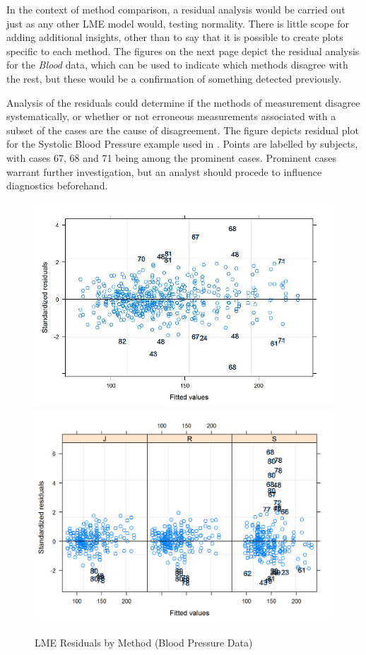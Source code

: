 \documentclass[12pt, a4paper]{report}
\theoremstyle{plain}
\theoremstyle{definition}
\theoremstyle{remark}
\begin{document}
In the context of method comparison, a residual analysis would be carried out just as any other LME model would, testing normality. There is little scope for adding additional insights, other than to say that it is possible to create plots specific to each method. The figures on the next page depict the residual analysis for the \textit{Blood} data, which can be used to indicate which methods disagree with the rest, but these would be a confirmation of something detected previously.

Analysis of the residuals could determine if the methods of measurement disagree systematically, or whether or not erroneous measurements associated with a subset of the cases are the cause of disagreement. 
The figure depicts residual plot for the Systolic Blood Pressure example used in \citet{BA99}. Points are labelled by subjects, with cases 67, 68 and 71 being among the prominent cases. Prominent cases warrant further investigation, but an analyst should procede to influence diagnostics beforehand.

\begin{figure}[h!]
	\centering
	\includegraphics[width=0.9\linewidth]{images/Residuals-JS-Roy}\\
	\includegraphics[width=0.9\linewidth]{images/bloodnlme-ResidPlot}
	\caption{LME Residuals by Method (Blood Pressure Data)}
\end{figure}
\end{document}

